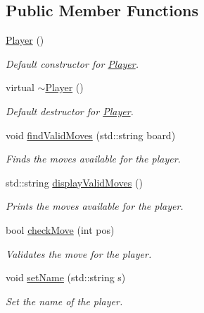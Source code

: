 \subsection*{Public Member Functions}
\begin{DoxyCompactItemize}
\item 
\mbox{\label{classPlayer_affe0cc3cb714f6deb4e62f0c0d3f1fd8}} 
\mbox{\hyperlink{classPlayer_affe0cc3cb714f6deb4e62f0c0d3f1fd8}{Player}} ()
\begin{DoxyCompactList}\small\item\em Default constructor for \mbox{\hyperlink{classPlayer}{Player}}. \end{DoxyCompactList}\item 
\mbox{\label{classPlayer_a749d2c00e1fe0f5c2746f7505a58c062}} 
virtual \mbox{\hyperlink{classPlayer_a749d2c00e1fe0f5c2746f7505a58c062}{$\sim$\+Player}} ()
\begin{DoxyCompactList}\small\item\em Default destructor for \mbox{\hyperlink{classPlayer}{Player}}. \end{DoxyCompactList}\item 
void \mbox{\hyperlink{classPlayer_affad011a9ad4f41e3ee316bb0be47d10}{find\+Valid\+Moves}} (std\+::string board)
\begin{DoxyCompactList}\small\item\em Finds the moves available for the player. \end{DoxyCompactList}\item 
std\+::string \mbox{\hyperlink{classPlayer_a00b37112d7ee56c91a0219dcacaece68}{display\+Valid\+Moves}} ()
\begin{DoxyCompactList}\small\item\em Prints the moves available for the player. \end{DoxyCompactList}\item 
bool \mbox{\hyperlink{classPlayer_a304c0a31df5ccf7acbdb2a2381facbb5}{check\+Move}} (int pos)
\begin{DoxyCompactList}\small\item\em Validates the move for the player. \end{DoxyCompactList}\item 
void \mbox{\hyperlink{classPlayer_af832a5f872ae4975563c3c5519320361}{set\+Name}} (std\+::string s)
\begin{DoxyCompactList}\small\item\em Set the name of the player. \end{DoxyCompactList}\item 

\end{DoxyCompactItemize}
